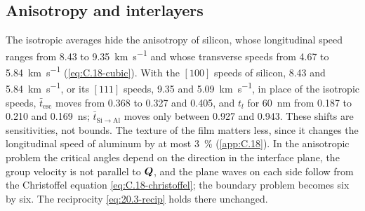 \subsection{Anisotropy and interlayers}\label{sec:20.3-aniso}

The isotropic averages hide the anisotropy of silicon, whose longitudinal speed ranges from 8.43 to \SI{9.35}{km.s^{-1}} and whose transverse speeds from 4.67 to \SI{5.84}{km.s^{-1}} (\cref{eq:C.18-cubic}). With the $[100]$ speeds of silicon, 8.43 and \SI{5.84}{km.s^{-1}}, or its $[111]$ speeds, 9.35 and \SI{5.09}{km.s^{-1}}, in place of the isotropic speeds, $\bar t_{\mathrm{esc}}$ moves from 0.368 to 0.327 and 0.405, and $t_l$ for \SI{60}{nm} from 0.187 to 0.210 and \SI{0.169}{ns}; $\bar t_{\mathrm{Si\to Al}}$ moves only between 0.927 and 0.943. These shifts are sensitivities, not bounds. The texture of the film matters less, since it changes the longitudinal speed of aluminum by at most \SI{3}{\percent} (\cref{app:C.18}). In the anisotropic problem the critical angles depend on the direction in the interface plane, the group velocity is not parallel to $\bm{Q}$, and the plane waves on each side follow from the Christoffel equation \cref{eq:C.18-christoffel}; the boundary problem becomes six by six. The reciprocity \cref{eq:20.3-recip} holds there unchanged.

